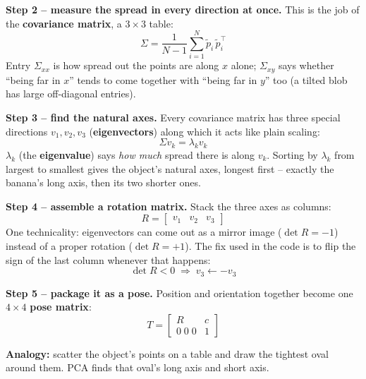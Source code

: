 \documentclass[11pt]{article}
\begin{document}
\textbf{Step 2 -- measure the spread in every direction at once.} This is
the job of the \textbf{covariance matrix}, a $3\times3$ table:
\[
\Sigma = \frac{1}{N-1}\sum_{i=1}^N \tilde p_i \,\tilde p_i^{\!\top}
\]
Entry $\Sigma_{xx}$ is how spread out the points are along $x$ alone;
$\Sigma_{xy}$ says whether ``being far in $x$'' tends to come together with
``being far in $y$'' too (a tilted blob has large off-diagonal entries).

\textbf{Step 3 -- find the natural axes.} Every covariance matrix has three
special directions $v_1, v_2, v_3$ (\textbf{eigenvectors}) along which it
acts like plain scaling:
\[
\Sigma v_k = \lambda_k v_k
\]
$\lambda_k$ (the \textbf{eigenvalue}) says \emph{how much} spread there is
along $v_k$. Sorting by $\lambda_k$ from largest to smallest gives the
object's natural axes, longest first -- exactly the banana's long axis,
then its two shorter ones.

\textbf{Step 4 -- assemble a rotation matrix.} Stack the three axes as
columns:
\[
R = \begin{bmatrix} v_1 & v_2 & v_3 \end{bmatrix}
\]
One technicality: eigenvectors can come out as a mirror image
($\det R = -1$) instead of a proper rotation ($\det R = +1$). The fix used
in the code is to flip the sign of the last column whenever that happens:
\[
\det R < 0 \;\Longrightarrow\; v_3 \leftarrow -v_3
\]

\textbf{Step 5 -- package it as a pose.} Position and orientation together
become one $4\times4$ \textbf{pose matrix}:
\[
T = \begin{bmatrix} R & c \\ 0\;0\;0 & 1 \end{bmatrix}
\]

\begin{center}
\end{center}

\textbf{Analogy:} scatter the object's points on a table and draw the
tightest oval around them. PCA finds that oval's long axis and short axis.
\end{document}
